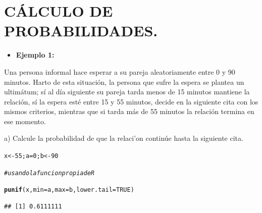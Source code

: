 \documentclass[12pt,letterpaper]{article}\usepackage[]{graphicx}\usepackage[]{color}
\makeatletter
\newcommand{\hlnum}[1]{\textcolor[rgb]{0.686,0.059,0.569}{#1}}%
\newcommand{\hlcom}[1]{\textcolor[rgb]{0.678,0.584,0.686}{\textit{#1}}}%
\newcommand{\hlstd}[1]{\textcolor[rgb]{0.345,0.345,0.345}{#1}}%
\newcommand{\hlkwb}[1]{\textcolor[rgb]{0.69,0.353,0.396}{#1}}%
\newcommand{\hlkwc}[1]{\textcolor[rgb]{0.333,0.667,0.333}{#1}}%
\newcommand{\hlkwd}[1]{\textcolor[rgb]{0.737,0.353,0.396}{\textbf{#1}}}%
\newenvironment{kframe}{%
 \def\at@end@of@kframe{}%
 \ifinner\ifhmode%
  \def\at@end@of@kframe{\end{minipage}}%
  \begin{minipage}{\columnwidth}%
 \fi\fi%
 \def\FrameCommand##1{\hskip\@totalleftmargin \hskip-\fboxsep
 \colorbox{shadecolor}{##1}\hskip-\fboxsep
     \hskip-\linewidth \hskip-\@totalleftmargin \hskip\columnwidth}%
 \MakeFramed {\advance\hsize-\width
   \@totalleftmargin\z@ \linewidth\hsize
   \@setminipage}}%
 {\par\unskip\endMakeFramed%
 \at@end@of@kframe}
\newenvironment{knitrout}{}{} %
\makeatother
\begin{document}
\section{C\'ALCULO DE PROBABILIDADES.}

\begin{itemize}
  \item \textbf{Ejemplo 1:}
\end{itemize}

Una persona informal hace esperar a su pareja aleatoriamente entre 0 y 90 minutos. Harto de esta situaci\'on, la persona que sufre la espera se plantea un ultim\'atum; s\'i al d\'ia siguiente su pareja tarda menos de 15 minutos mantiene la relaci\'on, s\'i la espera est\'e entre 15 y 55 minutos, decide en la siguiente cita con los mismos criterios, mientras que si tarda m\'as de 55 minutos la relaci\'on termina en ese momento.

\begin{description}
  \item a) Calcule la probabilidad de que la relaci'on contin\'ue hasta la siguiente cita. 
\begin{knitrout}
\color{fgcolor}\begin{kframe}
\begin{alltt}
\hlstd{x} \hlkwb{<-} \hlnum{55}\hlstd{; a}\hlkwb{=}\hlnum{0}\hlstd{; b} \hlkwb{<-} \hlnum{90}

\hlcom{# usando la funcion propia de R }

\hlkwd{punif}\hlstd{(x,} \hlkwc{min}\hlstd{=a,} \hlkwc{max}\hlstd{=b,} \hlkwc{lower.tail}\hlstd{=}\hlnum{TRUE}\hlstd{)}
\end{alltt}
\begin{verbatim}
## [1] 0.6111111
\end{verbatim}
\end{kframe}
\end{knitrout}
\end{description}
\end{document}
